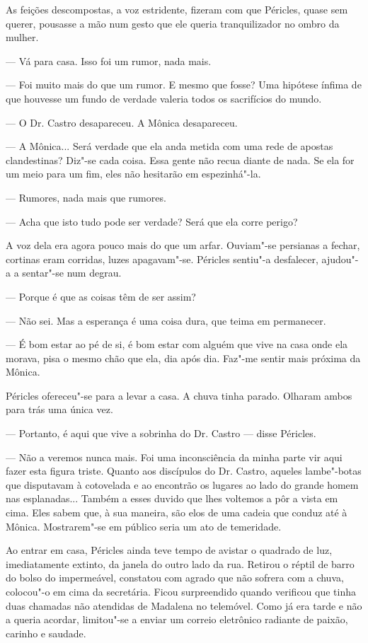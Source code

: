 As feições descompostas, a voz estridente, fizeram com que Péricles,
quase sem querer, pousasse a mão num gesto que ele queria tranquilizador
no ombro da mulher.

--- Vá para casa. Isso foi um rumor, nada mais.

--- Foi muito mais do que um rumor. E mesmo que fosse? Uma hipótese ínfima
  de que houvesse um fundo de verdade valeria todos os sacrifícios do
  mundo.

--- O Dr. Castro desapareceu. A Mônica desapareceu.

--- A Mônica... Será verdade que ela anda metida com uma rede de apostas
  clandestinas? Diz"-se cada coisa. Essa gente não recua diante de
  nada. Se ela for um meio para um fim, eles não hesitarão em
  espezinhá"-la.

--- Rumores, nada mais que rumores.

--- Acha que isto tudo pode ser verdade? Será que ela corre perigo?


A voz dela era agora pouco mais do que um arfar. Ouviam"-se persianas a fechar, cortinas eram corridas, luzes apagavam"-se.
Péricles sentiu"-a desfalecer, ajudou"-a a sentar"-se num degrau.

--- Porque é que as coisas têm de ser assim?

--- Não sei. Mas a esperança é uma coisa dura, que teima em permanecer.

--- É bom estar ao pé de si, é bom estar com alguém que vive na casa onde
  ela morava, pisa o mesmo chão que ela, dia após dia. Faz"-me sentir
  mais próxima da Mônica.

Péricles ofereceu"-se para a levar a casa. A chuva tinha parado. Olharam
ambos para trás uma única vez.

--- Portanto, é aqui que vive a sobrinha do Dr. Castro --- disse Péricles.

--- Não a veremos nunca mais. Foi uma inconsciência da minha parte vir
  aqui fazer esta figura triste. Quanto aos discípulos do Dr. Castro,
  aqueles lambe"-botas que disputavam à cotovelada e ao encontrão os
  lugares ao lado do grande homem nas esplanadas... Também a esses
  duvido que lhes voltemos a pôr a vista em cima. Eles sabem que, à sua
  maneira, são elos de uma cadeia que conduz até à Mônica. Mostrarem"-se
  em público seria um ato de temeridade.


Ao entrar em casa, Péricles ainda teve tempo de avistar o quadrado de
luz, imediatamente extinto, da janela do outro lado da rua. Retirou o
réptil de barro do bolso do impermeável, constatou com agrado que não
sofrera com a chuva, colocou"-o em cima da secretária. Ficou surpreendido
quando verificou que tinha duas chamadas não atendidas de Madalena no
telemóvel. Como já era tarde e não a queria acordar, limitou"-se a enviar
um correio eletrônico radiante de paixão, carinho e saudade.

